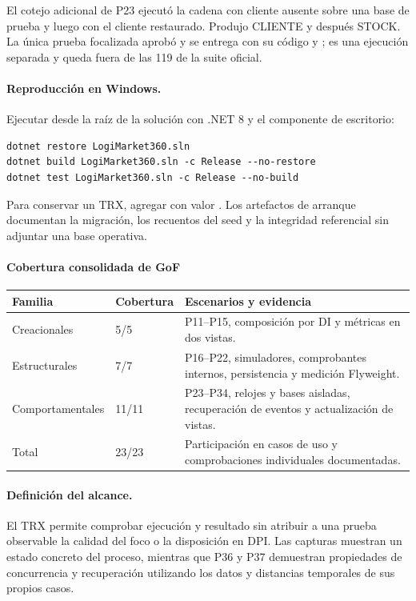 El cotejo adicional de P23 ejecutó la cadena con cliente ausente sobre una base de prueba y luego con el cliente restaurado. Produjo CLIENTE y después STOCK. La única prueba focalizada aprobó y se entrega con su código y ; es una ejecución separada y queda fuera de las 119 de la suite oficial.

\paragraph{Reproducción en Windows.}
Ejecutar desde la raíz de la solución con .NET 8 y el componente de escritorio:
\begin{verbatim}
dotnet restore LogiMarket360.sln
dotnet build LogiMarket360.sln -c Release --no-restore
dotnet test LogiMarket360.sln -c Release --no-build
\end{verbatim}
Para conservar un TRX, agregar  con valor . Los artefactos de arranque documentan la migración, los recuentos del seed y la integridad referencial sin adjuntar una base operativa.

\paragraph{Cobertura consolidada de GoF}
\begin{longtable}{@{}L{.25\linewidth}L{.18\linewidth}L{.50\linewidth}@{}}
\toprule Familia & Cobertura & Escenarios y evidencia \\ \midrule\endhead
Creacionales & 5/5 & P11--P15, composición por DI y métricas en dos vistas. \\
Estructurales & 7/7 & P16--P22, simuladores, comprobantes internos, persistencia y medición Flyweight. \\
Comportamentales & 11/11 & P23--P34, relojes y bases aisladas, recuperación de eventos y actualización de vistas. \\
\midrule Total & 23/23 & Participación en casos de uso y comprobaciones individuales documentadas.\\
\bottomrule
\end{longtable}




\paragraph{Definición del alcance.}
El TRX permite comprobar ejecución y resultado sin atribuir a una prueba observable la calidad del foco o la disposición en DPI. Las capturas muestran un estado concreto del proceso, mientras que P36 y P37 demuestran propiedades de concurrencia y recuperación utilizando los datos y distancias temporales de sus propios casos.


